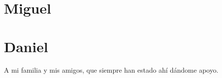 \chapter*{Miguel}

\chapter*{Daniel}
A mi familia y mis amigos, que siempre
han estado ahí dándome apoyo.